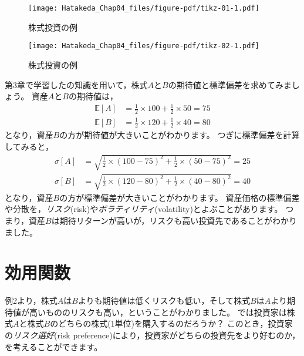 \documentclass[
  letterpaper,
  pandoc,
  ja=standard,
  jafont = hiragino-pron]{ltjsbook}
\begin{document}
\begin{figure}[H]

{\centering \texttt{[image: Hatakeda\_Chap04\_files/figure-pdf/tikz-01-1.pdf]}

}

\caption{株式投資の例}

\end{figure}%

\begin{figure}[H]

{\centering \texttt{[image: Hatakeda\_Chap04\_files/figure-pdf/tikz-02-1.pdf]}

}

\caption{株式投資の例}

\end{figure}%

第3章で学習したの知識を用いて，株式\(A\)と\(B\)の期待値と標準偏差を求めてみましょう。
資産\(A\)と\(B\)の期待値は， \[
\begin{aligned}
\mathbb{E}[A] &= \frac 12 \times 100 + \frac 12 \times 50 = 75\\
\mathbb{E}[B] &= \frac 12 \times 120 + \frac 12 \times 40 = 80
\end{aligned}
\] となり，資産\(B\)の方が期待値が大きいことがわかります。
つぎに標準偏差を計算してみると， \[
\begin{aligned}
\sigma  [A] &= \sqrt{ \frac 12 \times (100  - 75)^2 + \frac 12 \times (50 - 75)^2} = 25\\
\sigma  [B] &= \sqrt{ \frac 12 \times (120  - 80)^2 + \frac 12 \times (40 - 80)^2} = 40
\end{aligned}
\] となり，資産\(B\)の方が標準偏差が大きいことがわかります。
資産価格の標準偏差や分散を，\emph{リスク}(risk)や\emph{ボラティリティ}(volatility)とよぶことがあります。
つまり，資産\(B\)は期待リターンが高いが，リスクも高い投資先であることがわかりました。

\section{効用関数}\label{ux52b9ux7528ux95a2ux6570}

例2より，株式\(A\)は\(B\)よりも期待値は低くリスクも低い，そして株式\(B\)は\(A\)より期待値が高いもののリスクも高い，ということがわかりました。
では投資家は株式\(A\)と株式\(B\)のどちらの株式(1単位)を購入するのだろうか？
このとき，投資家の\emph{リスク選好}(risk
preference)により，投資家がどちらの投資先をより好むのか，を考えることができます。
\end{document}
